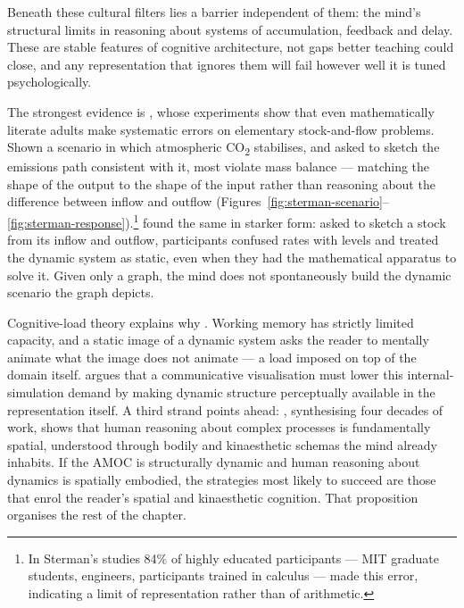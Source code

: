 Beneath these cultural filters lies a barrier independent of them: the mind's structural limits in reasoning about systems of accumulation, feedback and delay. These are stable features of cognitive architecture, not gaps better teaching could close, and any representation that ignores them will fail however well it is tuned psychologically.
 
The strongest evidence is \citet{sterman2008}, whose experiments show that even mathematically literate adults make systematic errors on elementary stock-and-flow problems. Shown a scenario in which atmospheric CO\textsubscript{2} stabilises, and asked to sketch the emissions path consistent with it, most violate mass balance --- matching the shape of the output to the shape of the input rather than reasoning about the difference between inflow and outflow (Figures~\ref{fig:sterman-scenario}--\ref{fig:sterman-response}).\footnote{In Sterman's studies 84\% of highly educated participants --- MIT graduate students, engineers, participants trained in calculus --- made this error, indicating a limit of representation rather than of arithmetic.} \citet{cronin2009} found the same in starker form: asked to sketch a stock from its inflow and outflow, participants confused rates with levels and treated the dynamic system as static, even when they had the mathematical apparatus to solve it. Given only a graph, the mind does not spontaneously build the dynamic scenario the graph depicts.
 

 
Cognitive-load theory explains why \citep{sweller1988, swellervanmerrienboer2019}. Working memory has strictly limited capacity, and a static image of a dynamic system asks the reader to mentally animate what the image does not animate --- a load imposed on top of the domain itself. \citet{ware2021} argues that a communicative visualisation must lower this internal-simulation demand by making dynamic structure perceptually available in the representation itself. A third strand points ahead: \citet{tversky2019}, synthesising four decades of work, shows that human reasoning about complex processes is fundamentally spatial, understood through bodily and kinaesthetic schemas the mind already inhabits. If the AMOC is structurally dynamic and human reasoning about dynamics is spatially embodied, the strategies most likely to succeed are those that enrol the reader's spatial and kinaesthetic cognition. That proposition organises the rest of the chapter.

